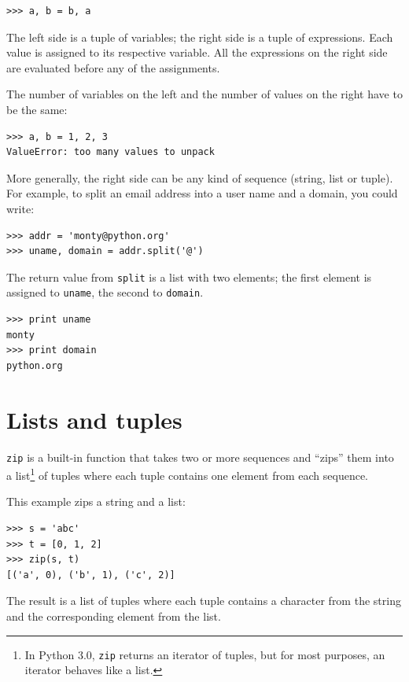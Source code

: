 \documentclass[10pt]{book}
\begin{document}
\beforeverb
\begin{verbatim}
>>> a, b = b, a
\end{verbatim}
\afterverb
%
The left side is a tuple of variables; the right side is a tuple of
expressions.  Each value is assigned to its respective variable.  
All the expressions on the right side are evaluated before any
of the assignments.

The number of variables on the left and the number of
values on the right have to be the same:


\beforeverb
\begin{verbatim}
>>> a, b = 1, 2, 3
ValueError: too many values to unpack
\end{verbatim}
\afterverb
%
More generally, the right side can be any kind of sequence
(string, list or tuple).  For example, to split an email address
into a user name and a domain, you could write:


\beforeverb
\begin{verbatim}
>>> addr = 'monty@python.org'
>>> uname, domain = addr.split('@')
\end{verbatim}
\afterverb
%
The return value from {\tt split} is a list with two elements;
the first element is assigned to {\tt uname}, the second to
{\tt domain}.

\beforeverb
\begin{verbatim}
>>> print uname
monty
>>> print domain
python.org
\end{verbatim}
\afterverb
%

\section{Lists and tuples}


{\tt zip} is a built-in function that takes two or more sequences and
``zips'' them into a list\footnote{In Python 3.0, {\tt zip} returns an
  iterator of tuples, but for most purposes, an iterator behaves like
  a list.} of tuples where each tuple contains one element from each
sequence.


This example zips a string and a list:

\beforeverb
\begin{verbatim}
>>> s = 'abc'
>>> t = [0, 1, 2]
>>> zip(s, t)
[('a', 0), ('b', 1), ('c', 2)]
\end{verbatim}
\afterverb
%
The result is a list of tuples where each tuple contains
a character from the string and the corresponding element from
the list.
\end{document}
